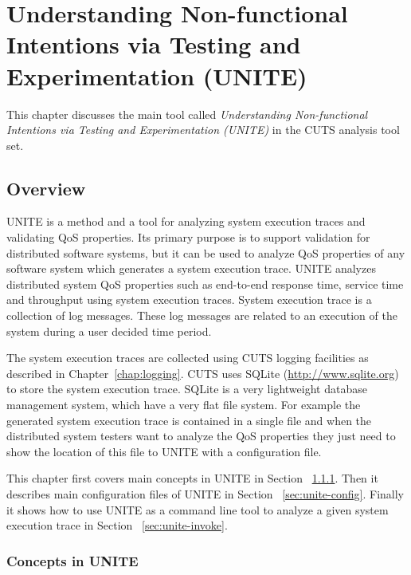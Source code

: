 
\chapter{Understanding Non-functional Intentions via Testing and Experimentation (UNITE)}
\label{chap:unite}

This chapter discusses the main tool called \textit{Understanding 
Non-functional Intentions via Testing and Experimentation (UNITE)} in the CUTS 
analysis tool set. 

\section{Overview}
\label{sec:unite-overview}

UNITE is a method and a tool for analyzing system execution 
traces and validating QoS properties. Its primary purpose
is to support validation for distributed software systems,
but it can be used to analyze QoS properties of any software
system which generates a system execution trace. 
UNITE analyzes distributed system QoS properties such as 
end-to-end response time, service time and throughput using system 
execution traces. System execution trace is a collection of log messages.
These log messages are related to an execution of the system during a user 
decided time period. 

The system execution traces are collected 
using CUTS logging facilities as described in Chapter~\ref{chap:logging}.
CUTS uses SQLite (\url{http://www.sqlite.org}) 
to store the system execution trace. SQLite is a very lightweight 
database management system, which have a very flat file system. For example 
the generated system execution trace is contained in a single file and when 
the distributed system testers want to analyze the QoS properties they 
just need to show the location of this file to UNITE with a configuration 
file. 

This chapter first covers main concepts in UNITE in Section ~\ref{sec:unite-concepts}. 
Then it describes main configuration files of UNITE in  Section ~\ref{sec:unite-config}. 
Finally it shows how to use UNITE as a command line tool to analyze 
a given system execution trace in Section ~\ref{sec:unite-invoke}.

\subsection{Concepts in UNITE}
\label{sec:unite-concepts}

